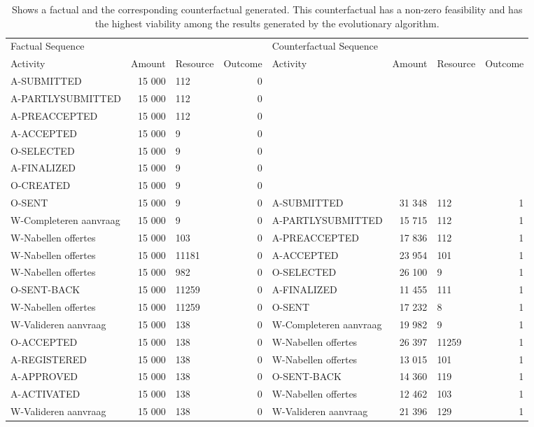 \begin{table}
\caption{Shows a factual and the corresponding counterfactual generated. This counterfactual has a non-zero feasibility and has the highest viability among the results generated by the evolutionary algorithm.}
\label{tbl:example-cf-evo-feasibility}
\begin{tabular}{lrlrlrlr}
\toprule
\multicolumn{4}{l}{Factual Sequence} & \multicolumn{4}{l}{Counterfactual Sequence} \\
Activity & Amount & Resource & Outcome & Activity & Amount & Resource & Outcome \\
\midrule
A-SUBMITTED & 15 000 & 112 & 0 &  &  &  &  \\
A-PARTLYSUBMITTED & 15 000 & 112 & 0 &  &  &  &  \\
A-PREACCEPTED & 15 000 & 112 & 0 &  &  &  &  \\
A-ACCEPTED & 15 000 & 9 & 0 &  &  &  &  \\
O-SELECTED & 15 000 & 9 & 0 &  &  &  &  \\
A-FINALIZED & 15 000 & 9 & 0 &  &  &  &  \\
O-CREATED & 15 000 & 9 & 0 &  &  &  &  \\
O-SENT & 15 000 & 9 & 0 & A-SUBMITTED & 31 348 & 112 & 1 \\
W-Completeren aanvraag & 15 000 & 9 & 0 & A-PARTLYSUBMITTED & 15 715 & 112 & 1 \\
W-Nabellen offertes & 15 000 & 103 & 0 & A-PREACCEPTED & 17 836 & 112 & 1 \\
W-Nabellen offertes & 15 000 & 11181 & 0 & A-ACCEPTED & 23 954 & 101 & 1 \\
W-Nabellen offertes & 15 000 & 982 & 0 & O-SELECTED & 26 100 & 9 & 1 \\
O-SENT-BACK & 15 000 & 11259 & 0 & A-FINALIZED & 11 455 & 111 & 1 \\
W-Nabellen offertes & 15 000 & 11259 & 0 & O-SENT & 17 232 & 8 & 1 \\
W-Valideren aanvraag & 15 000 & 138 & 0 & W-Completeren aanvraag & 19 982 & 9 & 1 \\
O-ACCEPTED & 15 000 & 138 & 0 & W-Nabellen offertes & 26 397 & 11259 & 1 \\
A-REGISTERED & 15 000 & 138 & 0 & W-Nabellen offertes & 13 015 & 101 & 1 \\
A-APPROVED & 15 000 & 138 & 0 & O-SENT-BACK & 14 360 & 119 & 1 \\
A-ACTIVATED & 15 000 & 138 & 0 & W-Nabellen offertes & 12 462 & 103 & 1 \\
W-Valideren aanvraag & 15 000 & 138 & 0 & W-Valideren aanvraag & 21 396 & 129 & 1 \\
\bottomrule
\end{tabular}
\end{table}
